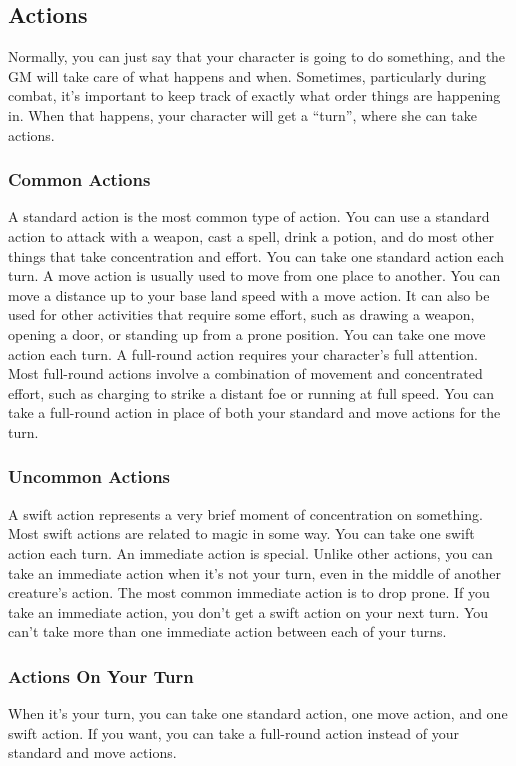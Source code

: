 \subsection{Actions}
Normally, you can just say that your character is going to do something, and the GM will take care of what happens and when. Sometimes, particularly during combat, it's important to keep track of exactly what order things are happening in. When that happens, your character will get a ``turn'', where she can take actions.

\subsubsection{Common Actions}
 A standard action is the most common type of action. You can use a standard action to attack with a weapon, cast a spell, drink a potion, and do most other things that take concentration and effort. You can take one standard action each turn.
 A move action is usually used to move from one place to another. You can move a distance up to your base land speed with a move action. It can also be used for other activities that require some effort, such as drawing a weapon, opening a door, or standing up from a prone position. You can take one move action each turn.
 A full-round action requires your character's full attention. Most full-round actions involve a combination of movement and concentrated effort, such as charging to strike a distant foe or running at full speed. You can take a full-round action in place of both your standard and move actions for the turn.

\subsubsection{Uncommon Actions}
 A swift action represents a very brief moment of concentration on something. Most swift actions are related to magic in some way. You can take one swift action each turn.
 An immediate action is special. Unlike other actions, you can take an immediate action when it's not your turn, even in the middle of another creature's action. The most common immediate action is to drop prone. If you take an immediate action, you don't get a swift action on your next turn. You can't take more than one immediate action between each of your turns.

\subsubsection{Actions On Your Turn}
When it's your turn, you can take one standard action, one move action, and one swift action. If you want, you can take a full-round action instead of your standard and move actions.


